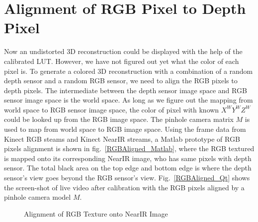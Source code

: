 \section{Alignment of RGB Pixel to Depth Pixel}
Now an undistorted 3D reconstruction could be displayed with the help of the calibrated LUT. However, we have not figured out yet what the color of each pixel is. To generate a colored 3D reconstruction with a combination of a random depth sensor and a random RGB sensor, we need to align the RGB pixels to depth pixels. The intermediate between the depth sensor image space and RGB sensor image space is the world space. As long as we figure out the mapping from world space to RGB sensor image space, the color of pixel with known \(X^WY^WZ^W\) could be looked up from the RGB image space. The pinhole camera matrix \(M\) is used to map from world space to RGB image space. Using the frame data from Kinect RGB steams and Kinect NearIR streams, a Matlab prototype of RGB pixels alignment is shown in fig.~\ref{RGBAligned_Matlab}, where the RGB textured is mapped onto its corresponding NearIR image, who has same pixels with depth sensor. The total black area on the top edge and bottom edge is where the depth sensor's view goes beyond the RGB sensor's view. Fig.~\ref{RGBAligned_Qt} shows the screen-shot of live video after calibration with the RGB pixels aligned by a pinhole camera model \(M\).

%
 \begin{figure}[t]
\hspace*{-0.5cm}
\centering
{}
\caption{Alignment of RGB Texture onto NearIR Image}
\label{Adaptive_Thresholding}
\end{figure}%
%

